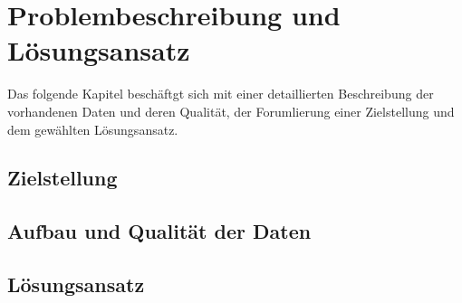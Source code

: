 \chapter{Problembeschreibung und Lösungsansatz}

Das folgende Kapitel beschäftgt sich mit einer detaillierten Beschreibung der vorhandenen Daten und deren Qualität, der Forumlierung einer Zielstellung und dem gewählten Lösungsansatz.

\section{Zielstellung}

\section{Aufbau und Qualität der Daten}

\section{Lösungsansatz}